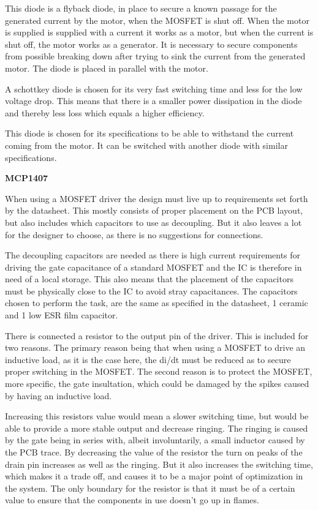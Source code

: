 This diode is a flyback diode, in place to secure a known passage for the generated current by the motor, when the MOSFET is shut off. When the motor is supplied is supplied with a current it works as a motor, but when the current is shut off, the motor works as a generator. It is necessary to secure components from possible breaking down after trying to sink the current from the generated motor. The diode is placed in parallel with the motor.

A schottkey diode is chosen for its very fast switching time and less for the low voltage drop. This means that there is a smaller power dissipation in the diode and thereby less loss which equals a higher efficiency. 

This diode is chosen for its specifications to be able to withstand the current coming from the motor. It can be switched with another diode with similar specifications.

\textbf{MCP1407} 

When using a MOSFET driver the design must live up to requirements set forth by the datasheet. This mostly consists of proper placement on the PCB layout, but also includes which capacitors to use as decoupling. But it also leaves a lot for the designer to choose, as there is no suggestions for connections. 

The decoupling capacitors are needed as there is high current requirements for driving the gate capacitance of a standard MOSFET and the IC is therefore in need of a local storage. This also means that the placement of the capacitors must be physically close to the IC to avoid stray capacitances. The capacitors chosen to perform the task, are the same as specified in the datasheet, 1 ceramic and 1 low ESR film capacitor. 

There is connected a resistor to the output pin of the driver. This is included for two reasons. The primary reason being that when using a MOSFET to drive an inductive load, as it is the case here, the di/dt must be reduced as to secure proper switching in the MOSFET. The second reason is to protect the MOSFET, more specific, the gate insultation, which could be damaged by the spikes caused by having an inductive load.

Increasing this resistors value would mean a slower switching time, but would be able to provide a more stable output and decrease ringing. The ringing is caused by the gate being in series with, albeit involuntarily, a small inductor caused by the PCB trace. By decreasing the value of the resistor the turn on peaks of the drain pin increases as well as the ringing. But it also increases the switching time, which makes it a trade off, and causes it to be a major point of optimization in the system. The only boundary for the resistor is that it must be of a certain value to ensure that the components in use doesn't go up in flames.   

